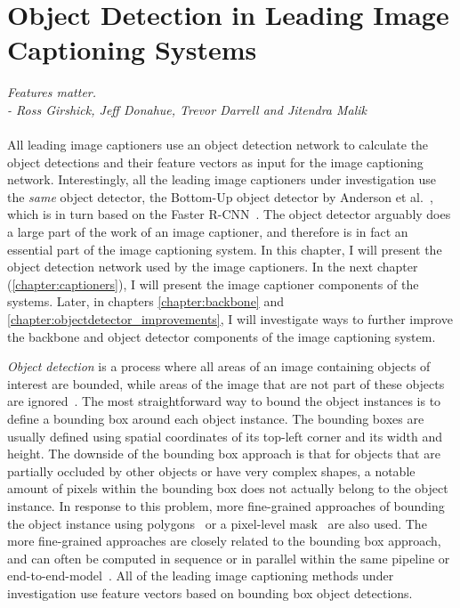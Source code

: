 \documentclass[english,twoside,openright]{HYgraduMLDS}
\begin{document}
\chapter{Object Detection in Leading Image Captioning Systems}
\label{chapter:objectdetector}

\textit{Features matter.} \\
\textit{- Ross Girshick, Jeff Donahue, Trevor Darrell and Jitendra Malik} \\
\\
%
All leading image captioners use an object detection network to calculate the object detections and their feature vectors as input for the image captioning network. Interestingly, all the leading image captioners under investigation use the \textit{same} object detector, the Bottom-Up object detector by Anderson et al.~\cite{BottomUp}, which is in turn based on the Faster R-CNN~\cite{FasterRCNN}. The object detector arguably does a large part of the work of an image captioner, and therefore is in fact an essential part of the image captioning system. In this chapter, I will present the object detection network used by the image captioners. In the next chapter (\ref{chapter:captioners}), I will present the image captioner components of the systems. Later, in chapters \ref{chapter:backbone} and \ref{chapter:objectdetector_improvements}, I will investigate ways to further improve the backbone and object detector components of the image captioning system.

\textit{Object detection} is a process where all areas of an image containing objects of interest are bounded, while areas of the image that are not part of these objects are ignored~\cite{PolyYOLO}. The most straightforward way to bound the object instances is to define a bounding box around each object instance. The bounding boxes are usually defined using spatial coordinates of its top-left corner and its width and height. The downside of the bounding box approach is that for objects that are partially occluded by other objects or have very complex shapes, a notable amount of pixels within the bounding box does not actually belong to the object instance. In response to this problem, more fine-grained approaches of bounding the object instance using polygons~\cite{PolyYOLO} or a pixel-level mask~\cite{MaskRCNN} are also used. The more fine-grained approaches are closely related to the bounding box approach, and can often be computed in sequence or in parallel within the same pipeline or end-to-end-model~\cite{PolyYOLO, DETR}. All of the leading image captioning methods under investigation use feature vectors based on bounding box object detections. 
\end{document}
